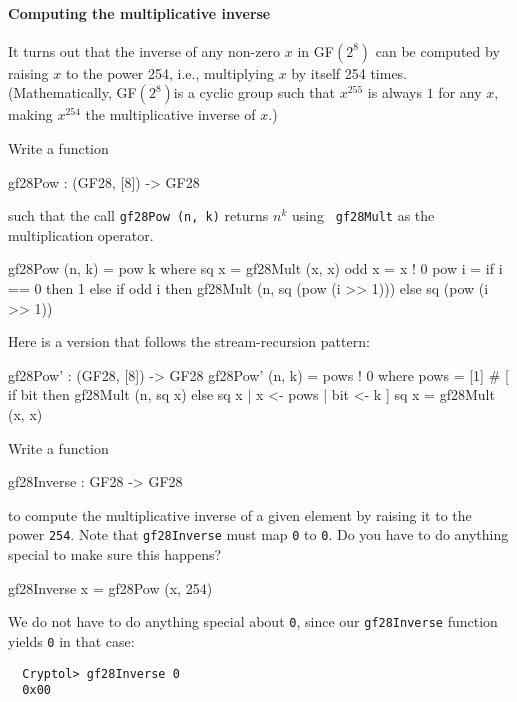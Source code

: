 \paragraph*{Computing the multiplicative inverse} It turns out that the
inverse of any non-zero $x$ in GF$(2^8)$ can be computed by raising
$x$ to the power 254, i.e., multiplying $x$ by itself 254
times. (Mathematically, GF$(2^8)$\indGF is a cyclic group such that
$x^{255}$ is always $1$ for any $x$, making $x^{254}$ the
multiplicative inverse of $x$.)

\begin{Exercise}\label{ex:gfmi:0}
Write a function
\begin{code}
  gf28Pow : (GF28, [8]) -> GF28
\end{code}
such that the call {\tt gf28Pow (n, k)} returns $n^k$ using {\tt
  gf28Mult} as the multiplication operator.  
\end{Exercise}
\begin{Answer}
\begin{code}
  gf28Pow (n, k) = pow k
     where   sq x  = gf28Mult (x, x)
             odd x = x ! 0
             pow i = if i == 0 then 1
                     else if odd i
                          then gf28Mult (n, sq (pow (i >> 1)))
                          else sq (pow (i >> 1))
\end{code}
Here is a version that follows the stream-recursion pattern:
\begin{code}
  gf28Pow' : (GF28, [8]) -> GF28
  gf28Pow' (n, k) = pows ! 0
    where   pows = [1] # [ if bit then gf28Mult (n, sq x)
                                  else sq x
                         | x <- pows
                         | bit <- k
                         ]
            sq x = gf28Mult (x, x)
\end{code}
\end{Answer}

\begin{Exercise}\label{ex:gfmi:01}
Write a function
\begin{code}
  gf28Inverse : GF28 -> GF28
\end{code}
to compute the multiplicative inverse of a given element by raising it
to the power \texttt{254}. Note that {\tt gf28Inverse} must map \texttt{0} to
\texttt{0}. Do you have to do anything special to make sure this happens?
\end{Exercise}
\begin{Answer}
\begin{code}
  gf28Inverse x = gf28Pow (x, 254)
\end{code}
We do not have to do anything special about \texttt{0}, since our
\texttt{gf28Inverse} function yields \texttt{0} in that case:
\begin{Verbatim}
  Cryptol> gf28Inverse 0
  0x00
\end{Verbatim}
\end{Answer}

